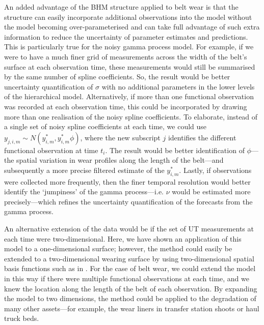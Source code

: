 An added advantage of the BHM structure applied to belt wear is that the structure can easily incorporate additional observations into the model without the model becoming over-parameterised and can take full advantage of such extra information to reduce the uncertainty of parameter estimates and predictions. This is particularly true for the noisy gamma process model. For example, if we were to have a much finer grid of measurements across the width of the belt's surface at each observation time, these measurements would still be summarised by the same number of spline coefficients. So, the result would be better uncertainty quantification of $\sigma$ with no additional parameters in the lower levels of the hierarchical model. Alternatively, if more than one functional observation was recorded at each observation time, this could be incorporated by drawing more than one realisation of the noisy spline coefficients. To elaborate, instead of a single set of noisy spline coefficients at each time, we could use $y_{j, i, m} \sim N(y^*_{i, m}, y^*_{i, m}\phi)$, where the new subscript $j$ identifies the different functional observation at time $t_i$. The result would be better identification of $\phi$---the spatial variation in wear profiles along the length of the belt---and subsequently a more precise filtered estimate of the $y^*_{i, m}$. Lastly, if observations were collected more frequently, then the finer temporal resolution would better identify the `jumpiness' of the gamma process---i.e. $\nu$ would be estimated more precisely---which refines the uncertainty quantification of the forecasts from the gamma process. 

An alternative extension of the data would be if the set of UT measurements at each time were two-dimensional. Here, we have shown an application of this model to a one-dimensional surface; however, the method could easily be extended to a two-dimensional wearing surface by using two-dimensional spatial basis functions such as in \citet[p. 84]{wikle_2019}. For the case of belt wear, we could extend the model in this way if there were multiple functional observations at each time, and we knew the location along the length of the belt of each observation. By expanding the model to two dimensions, the method could be applied to the degradation of many other assets---for example, the wear liners in transfer station shoots or haul truck beds.

